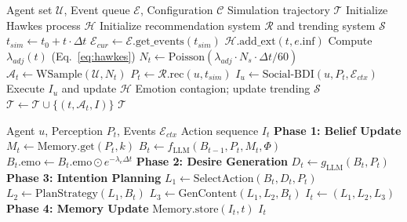 \documentclass[a4paper,fleqn]{cas-dc}
\begin{document}
\begin{algorithm}[!ht]
\caption{POSIM Main Simulation Loop}
\label{alg:main}
\begin{algorithmic}[1]
\REQUIRE Agent set $\mathcal{U}$, Event queue $\mathcal{E}$, Configuration $\mathcal{C}$
\ENSURE Simulation trajectory $\mathcal{T}$
\STATE Initialize Hawkes process $\mathcal{H}$
\STATE Initialize recommendation system $\mathcal{R}$ and trending system $\mathcal{S}$
  \STATE $t_{sim} \leftarrow t_0 + t \cdot \Delta t$
  \STATE $\mathcal{E}_{cur} \leftarrow \mathcal{E}.\text{get\_events}(t_{sim})$
    \STATE $\mathcal{H}.\text{add\_ext}(t, e.\text{inf})$
  \ENDFOR
  \STATE Compute $\lambda_{adj}(t)$ (Eq.~\ref{eq:hawkes})
  \STATE $N_t \!\leftarrow\! \text{Poisson}(\lambda_{adj} \!\cdot\! N_{s} \!\cdot\! \Delta t / 60)$
  \STATE $\mathcal{A}_t \leftarrow \text{WSample}(\mathcal{U}, N_t)$
    \STATE $P_t \leftarrow \mathcal{R}.\text{rec}(u, t_{sim})$
    \STATE $I_u \leftarrow \text{Social-BDI}(u, P_t, \mathcal{E}_{ctx})$
    \STATE Execute $I_u$ and update $\mathcal{H}$
  \ENDFOR
  \STATE Emotion contagion; update trending $\mathcal{S}$
  \STATE $\mathcal{T} \leftarrow \mathcal{T} \cup \{(t, \mathcal{A}_t, I)\}$
\ENDFOR
\RETURN $\mathcal{T}$
\end{algorithmic}
\end{algorithm}

\begin{algorithm}[!ht]
\caption{Social-BDI Cognitive Decision Pipeline}
\label{alg:bdi}
\begin{algorithmic}[1]
\REQUIRE Agent $u$, Perception $P_t$, Events $\mathcal{E}_{ctx}$
\ENSURE Action sequence $I_t$
\STATE \textbf{Phase 1: Belief Update}
\STATE $M_t \leftarrow \text{Memory.get}(P_t, k)$
\STATE $B_t \leftarrow f_{\text{LLM}}(B_{t-1}, P_t, M_t, \Phi)$
\STATE $B_t.\text{emo} \leftarrow B_t.\text{emo} \odot e^{-\lambda_e \Delta t}$
\STATE \textbf{Phase 2: Desire Generation}
\STATE $D_t \leftarrow g_{\text{LLM}}(B_t, P_t)$
\STATE \textbf{Phase 3: Intention Planning}
\STATE $L_1 \leftarrow \text{SelectAction}(B_t, D_t, P_t)$
\STATE $L_2 \leftarrow \text{PlanStrategy}(L_1, B_t)$
\STATE $L_3 \leftarrow \text{GenContent}(L_1, L_2, B_t)$
\STATE $I_t \leftarrow (L_1, L_2, L_3)$
\STATE \textbf{Phase 4: Memory Update}
\STATE $\text{Memory.store}(I_t, t)$
\RETURN $I_t$
\end{algorithmic}
\end{algorithm}
\end{document}
